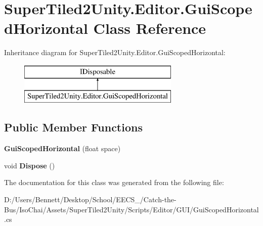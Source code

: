 \hypertarget{class_super_tiled2_unity_1_1_editor_1_1_gui_scoped_horizontal}{}\section{Super\+Tiled2\+Unity.\+Editor.\+Gui\+Scoped\+Horizontal Class Reference}
\label{class_super_tiled2_unity_1_1_editor_1_1_gui_scoped_horizontal}
Inheritance diagram for Super\+Tiled2\+Unity.\+Editor.\+Gui\+Scoped\+Horizontal\+:\begin{figure}[H]
\begin{center}
\leavevmode
\includegraphics[height=2.000000cm]{class_super_tiled2_unity_1_1_editor_1_1_gui_scoped_horizontal}
\end{center}
\end{figure}
\subsection*{Public Member Functions}
\begin{DoxyCompactItemize}
\item 
\mbox{\label{class_super_tiled2_unity_1_1_editor_1_1_gui_scoped_horizontal_a6fa6a2075b3baec6728cc1a15943ef00}} 
{\bfseries Gui\+Scoped\+Horizontal} (float space)
\item 
\mbox{\label{class_super_tiled2_unity_1_1_editor_1_1_gui_scoped_horizontal_a326f4fd38378385a1d68bdc48d56e140}} 
void {\bfseries Dispose} ()
\end{DoxyCompactItemize}


The documentation for this class was generated from the following file\+:\begin{DoxyCompactItemize}
\item 
D\+:/\+Users/\+Bennett/\+Desktop/\+School/\+E\+E\+C\+S\+\_/\+Catch-\/the-\/\+Bus/\+Iso\+Chai/\+Assets/\+Super\+Tiled2\+Unity/\+Scripts/\+Editor/\+G\+U\+I/Gui\+Scoped\+Horizontal.\+cs\end{DoxyCompactItemize}
